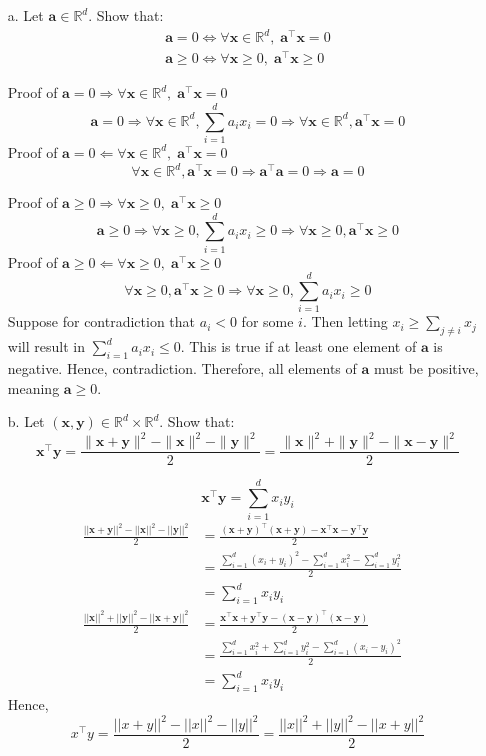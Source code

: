 \documentclass[11pt]{article}
\newcommand{\R}{\mathbb{R}}                     %
\newcommand{\bx}{\mathbf{x}}
\newcommand{\by}{\mathbf{y}}
\newcommand{\ba}{\mathbf{a}}
\begin{document}
\begin{itemize}
    \item[a.] Let $\ba\in\R^d$. Show that:
        \begin{gather*}
            \ba = 0 \Longleftrightarrow \forall \bx\in\R^d,\;\ba^\intercal \bx = 0\\
            \ba \geq 0 \Longleftrightarrow \forall \bx\geq 0,\;\ba^\intercal \bx \geq 0
        \end{gather*}
        
\color{blue}
Proof of $ \ba = 0 \Rightarrow \forall \bx\in\R^d,\;\ba^\intercal \bx = 0$
$$\ba=0 \Rightarrow \forall \bx \in \R^d, \sum_{i=1}^d a_ix_i=0 \Rightarrow \forall \bx \in \R^d, \ba^\intercal \bx=0 $$
Proof of $ \ba = 0 \Leftarrow \forall \bx\in\R^d,\;\ba^\intercal \bx = 0$
$$\forall \bx \in \R^d, \ba^\intercal \bx=0 \Rightarrow \ba^\intercal \ba=0 \Rightarrow \ba=0$$

Proof of  $\ba \geq 0 \Rightarrow \forall \bx\geq 0,\;\ba^\intercal \bx \geq 0$
$$\ba \geq 0 \Rightarrow \forall \bx \geq 0, \sum_{i=1}^d a_ix_i \geq 0 \Rightarrow \forall \bx \geq 0, \ba^\intercal \bx \geq 0$$
Proof of  $\ba \geq 0 \Leftarrow \forall \bx\geq 0,\;\ba^\intercal \bx \geq 0$
$$\forall \bx \geq 0, \ba^\intercal \bx \geq 0 \Rightarrow \forall \bx \geq 0, \sum_{i=1}^d a_ix_i \geq 0$$ Suppose for contradiction that $a_i<0$ for some $i$. Then letting $x_i \geq \sum_{j\neq i} x_j$ will result in $\sum_{i=1}^d a_ix_i \leq 0$. This is true if at least one element of $\ba$ is negative. Hence, contradiction. Therefore, all elements of $\ba$ must be positive, meaning $\ba \geq 0$.
\color{black}

    \item[b.] Let $(\bx, \by)\in\R^d\times\R^d$. Show that:
        \begin{displaymath}
            \bx^\intercal \by = \frac{\|\bx+\by\|^2 - \|\bx\|^2-\|\by\|^2}{2}
            = \frac{\|\bx\|^2 + \|\by\|^2 - \|\bx-\by\|^2}{2}
        \end{displaymath}
        
\color{blue}
$$\bx^\intercal\by=\sum_{i=1}^d x_iy_i$$
\begin{align*}
\frac{||\bx+\by||^2-||\bx||^2-||\by||^2}{2} &= \frac{(\bx+\by)^\intercal (\bx+\by)-\bx^\intercal \bx-\by^\intercal \by}{2} &\\
&= \frac{\sum_{i=1}^d(x_i+y_i)^2-\sum_{i=1}^dx_i^2-\sum_{i=1}^dy_i^2}{2} &\\
&= \sum_{i=1}^d x_iy_i
\end{align*}
\begin{align*}
\frac{||\bx||^2+||\by||^2-||\bx+\by||^2}{2} &= \frac{\bx^\intercal \bx+\by^\intercal \by-(\bx-\by)^\intercal (\bx-\by)}{2} &\\
&= \frac{\sum_{i=1}^dx_i^2+\sum_{i=1}^dy_i^2-\sum_{i=1}^d(x_i-y_i)^2}{2} &\\
&= \sum_{i=1}^d x_iy_i
\end{align*}
Hence, $$x^\intercal y=\frac{||x+y||^2-||x||^2-||y||^2}{2}=\frac{||x||^2+||y||^2-||x+y||^2}{2}$$
\color{black}
        

\end{itemize}
\end{document}

